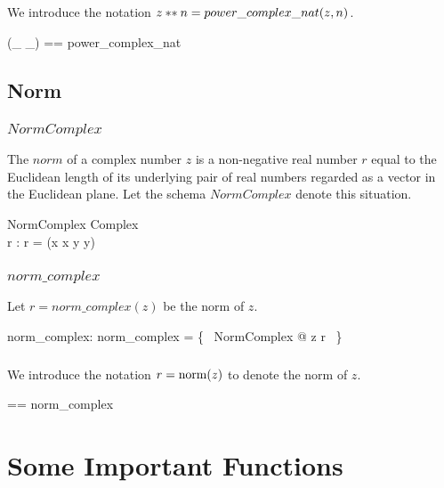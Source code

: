 \documentclass[11pt, oneside]{article}
\begin{document}
\subsubsection{}

We introduce the notation $z \mathbin{**} n = power\_complex\_nat(z, n)$.

\begin{zed}
	(\_ \powCN \_) == power\_complex\_nat
\end{zed}

\subsection{Norm}

\subsubsection{$NormComplex$}

The $norm$ of a complex number $z$ is a non-negative real number $r$
equal to the Euclidean length of its underlying pair of real numbers regarded
as a vector in the Euclidean plane.
Let the schema $NormComplex$ denote this situation.

\begin{schema}{NormComplex}
	Complex \\
	r : \R
\where
	r = \sqrtR(x \mulR x \addR y \mulR y)
\end{schema}

\subsubsection{$norm\_complex$}

Let $r = norm\_complex(z)$ be the norm of $z$.

\begin{axdef}
	norm\_complex: \C \fun \R
\where
	norm\_complex = \{~ NormComplex @ z \mapsto r ~\}
\end{axdef}

\subsubsection{}

We introduce the notation $r = \operatorname{norm}(z)$ to denote the norm of $z$.

\begin{zed}
	\normC == norm\_complex
\end{zed}

\section{Some Important Functions}
\end{document}
